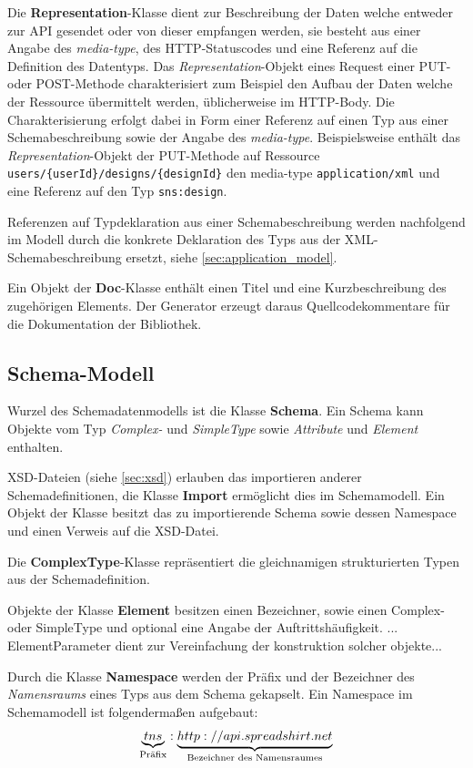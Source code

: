 Die \textbf{Representation}-Klasse dient zur Beschreibung der Daten welche entweder zur API gesendet oder von dieser empfangen werden, sie besteht aus einer Angabe des \emph{media-type}, des HTTP-Statuscodes und eine Referenz auf die Definition des Datentyps. Das \emph{Representation}-Objekt eines Request einer PUT- oder POST-Methode charakterisiert zum Beispiel den Aufbau der Daten welche der Ressource übermittelt werden, üblicherweise im HTTP-Body. Die Charakterisierung erfolgt dabei in Form einer Referenz auf einen Typ aus einer Schemabeschreibung sowie der Angabe des \emph{media-type}. Beispielsweise enthält das \emph{Representation}-Objekt der PUT-Methode auf Ressource \texttt{users/\{userId\}/designs/\{designId\}} den media-type \texttt{application/xml} und eine Referenz auf den Typ \texttt{sns:design}. 

Referenzen auf Typdeklaration aus einer Schemabeschreibung werden nachfolgend im Modell durch die konkrete Deklaration des Typs aus der XML-Schemabeschreibung ersetzt, siehe \cref{sec:application_model}. 

Ein Objekt der \textbf{Doc}-Klasse enthält einen Titel und eine Kurzbeschreibung des zugehörigen Elements.
Der Generator erzeugt daraus Quellcodekommentare für die Dokumentation der Bibliothek.

\subsection{Schema-Modell}
\label{sec:schema_model}

Wurzel des Schemadatenmodells ist die Klasse \textbf{Schema}. Ein Schema kann Objekte vom Typ \emph{Complex-} und \emph{SimpleType} sowie \emph{Attribute} und \emph{Element} enthalten.

XSD-Dateien (siehe \cref{sec:xsd}) erlauben das importieren anderer Schemadefinitionen, die Klasse \textbf{Import} ermöglicht dies im Schemamodell. Ein Objekt der Klasse besitzt das zu importierende Schema sowie dessen Namespace und einen Verweis auf die XSD-Datei.

Die \textbf{ComplexType}-Klasse repräsentiert die gleichnamigen strukturierten Typen aus der Schemadefinition. 

Objekte der Klasse \textbf{Element} besitzen einen Bezeichner, sowie einen Complex- oder SimpleType und optional eine Angabe der Auftrittshäufigkeit.
... ElementParameter dient zur Vereinfachung der konstruktion solcher objekte...

Durch die Klasse \textbf{Namespace} werden der Präfix und der Bezeichner des \emph{Namensraums} eines Typs aus dem Schema gekapselt. Ein Namespace im Schemamodell ist folgendermaßen aufgebaut: 
\[  
    \underbrace{tns}_{\small \text{Präfix}}:\underbrace{http://api.spreadshirt.net}_{\small \text{Bezeichner des Namensraumes}}
\]

